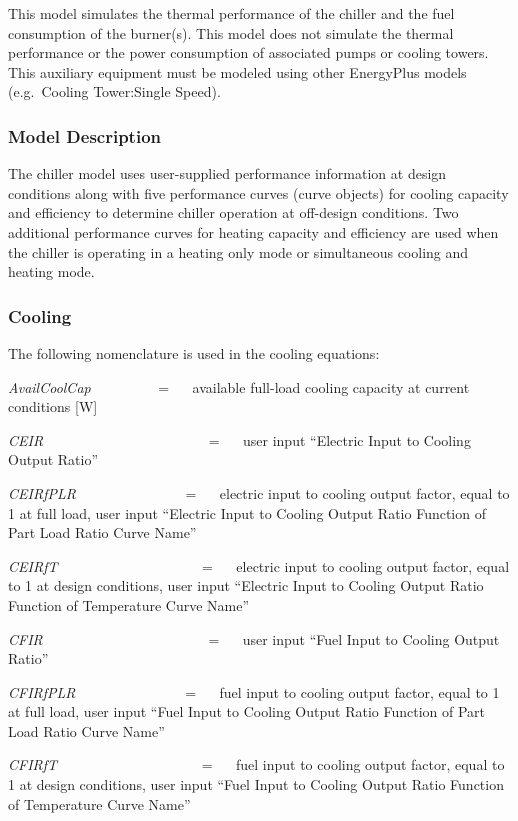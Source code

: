 This model simulates the thermal performance of the chiller and the fuel consumption of the burner(s). This model does not simulate the thermal performance or the power consumption of associated pumps or cooling towers. This auxiliary equipment must be modeled using other EnergyPlus models (e.g.~Cooling Tower:Single Speed).

\subsubsection{Model Description}\label{model-description-006}

The chiller model uses user-supplied performance information at design conditions along with five performance curves (curve objects) for cooling capacity and efficiency to determine chiller operation at off-design conditions. Two additional performance curves for heating capacity and efficiency are used when the chiller is operating in a heating only mode or simultaneous cooling and heating mode.

\subsubsection{Cooling}\label{cooling}

The following nomenclature is used in the cooling equations:

\emph{AvailCoolCap}~~~~~~~~~ = ~~ available full-load cooling capacity at current conditions {[}W{]}

\emph{CEIR}~~~~~~~~~~~~~~~~~~~~~~~ = ~~ user input ``Electric Input to Cooling Output Ratio''

\emph{CEIRfPLR}~~~~~~~~~~~~~~~ = ~~ electric input to cooling output factor, equal to 1 at full load, user input ``Electric Input to Cooling Output Ratio Function of Part Load Ratio Curve Name''

\emph{CEIRfT}~~~~~~~~~~~~~~~~~~~~ = ~~ electric input to cooling output factor, equal to 1 at design conditions, user input ``Electric Input to Cooling Output Ratio Function of Temperature Curve Name''

\emph{CFIR}~~~~~~~~~~~~~~~~~~~~~~~ = ~~ user input ``Fuel Input to Cooling Output Ratio''

\emph{CFIRfPLR}~~~~~~~~~~~~~~~ = ~~ fuel input to cooling output factor, equal to 1 at full load, user input ``Fuel Input to Cooling Output Ratio Function of Part Load Ratio Curve Name''

\emph{CFIRfT}~~~~~~~~~~~~~~~~~~~~ = ~~ fuel input to cooling output factor, equal to 1 at design conditions, user input ``Fuel Input to Cooling Output Ratio Function of Temperature Curve Name''

